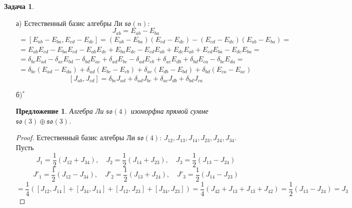 \documentclass[12pt]{article}
\newtheorem{predl}[theorem]{Предложение}
\theoremstyle{definition}
\newtheorem{zad}{Задача}[section]
\begin{document}
\begin{zad}
\begin{itemize}
    \item[а)] Естественный базис алгебры Ли $\mathfrak{so}(n)$:
    \begin{equation}
        J_{ab}=E_{ab}-E_{ba}
    \end{equation}
    \begin{multline}
        [J_{ab},J_{cd}]=[E_{ab}-E_{ba},E_{cd}-E_{dc}]=(E_{ab}-E_{ba})(E_{cd}-E_{dc})-(E_{cd}-E_{dc})(E_{ab}-E_{ba})=\\=E_{ab}E_{cd}-E_{ba}E_{cd}-E_{ab}E_{dc}+E_{ba}E_{dc}-E_{cd}E_{ab}+E_{dc}E_{ab}+E_{cd}E_{ba}-E_{dc}E_{ba}=\\=\delta_{bc}E_{ad}-\delta_{ac}E_{bd}-\delta_{bd}E_{ac}+\delta_{ad}E_{bc}-\delta_{ad}E_{cb}+\delta_{ac}E_{db}+\delta_{bd}E_{ca}-\delta_{bc}E_{da}=\\=\delta_{bc}(E_{ad}-E_{da})+\delta_{ad}(E_{bc}-E_{cb})+\delta_{ac}(E_{db}-E_{bd})+\delta_{bd}(E_{ca}-E_{ac})
    \end{multline}
    \begin{equation}
        \boxed{[J_{ab},J_{cd}]=\delta_{bc}J_{ad}+\delta_{ad}J_{bc}+\delta_{ac}J_{db}+\delta_{bd}J_{ca}}
    \end{equation}
    \item[б)$^*$] 
    \begin{predl}
        Алгебра Ли $\mathfrak{so}(4)$ изоморфна прямой сумме $\mathfrak{so}(3)\oplus\mathfrak{so}(3)$.
    \end{predl}
    \begin{proof}
        Естественный базис алгебры Ли $\mathfrak{so}(4)$: $J_{12}, J_{13}, J_{14}, J_{23}, J_{24}, J_{34}$. Пусть
        \begin{equation}
            J_1=\frac{1}{2}(J_{12}+J_{34}),\quad J_2=\frac{1}{2}(J_{14}+J_{23}),\quad J_3=\frac{1}{2}(J_{13}-J_{24})
        \end{equation}
        \begin{equation}
            J'_1=\frac{1}{2}(J_{12}-J_{34}),\quad J'_2=\frac{1}{2}(J_{13}+J_{24}),\quad J'_3=\frac{1}{2}(J_{14}-J_{23})
        \end{equation}
        \begin{equation*}
            [J_1,J_2]=\frac{1}{4}([J_{12},J_{14}]+[J_{34},J_{14}]+[J_{12},J_{23}]+[J_{34},J_{23}])=\frac{1}{4}(J_{42}+J_{13}+J_{13}+J_{42})=\frac{1}{2}(J_{13}-J_{24})=J_3
        \end{equation*}
        \begin{equation*}

\end{equation*}
\end{proof}
\end{itemize}
\end{zad}
\end{document}
